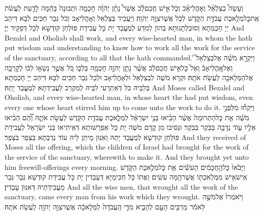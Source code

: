 \newperek
{}%
{וְעָשָׂה֩ בְצַלְאֵ֨ל וְאׇהֳלִיאָ֜ב וְכֹ֣ל \legarmeh  אִ֣ישׁ חֲכַם\maqqaf לֵ֗ב אֲשֶׁר֩ נָתַ֨ן יְהֹוָ֜ה חׇכְמָ֤ה וּתְבוּנָה֙ בָּהֵ֔מָּה לָדַ֣עַת לַעֲשֹׂ֔ת אֶֽת\maqqaf כׇּל\maqqaf מְלֶ֖אכֶת עֲבֹדַ֣ת הַקֹּ֑דֶשׁ לְכֹ֥ל אֲשֶׁר\maqqaf צִוָּ֖ה יְהֹוָֽה׃}
{וְיַעֲבֵיד בְּצַלְאֵל וְאָהֳלִיאָב וְכֹל גְּבַר חַכִּים לִבָּא דִּיהַב יְיָ חָכְמְתָא וְסוּכְלְתָנוּתָא בְּהוֹן לְמִדַּע לְמֶעֱבַד יָת כָּל עֲבִידַת פּוּלְחַן קוּדְשָׁא לְכָל דְּפַקֵּיד יְיָ׃}
{And Bezalel and Oholiab shall work, and every wise-hearted man, in whom the \lord\space hath put wisdom and understanding to know how to work all the work for the service of the sanctuary, according to all that the \lord\space hath commanded.’}{}
{וַיִּקְרָ֣א מֹשֶׁ֗ה אֶל\maqqaf בְּצַלְאֵל֮ וְאֶל\maqqaf אׇֽהֳלִיאָב֒ וְאֶל֙ כׇּל\maqqaf אִ֣ישׁ חֲכַם\maqqaf לֵ֔ב אֲשֶׁ֨ר נָתַ֧ן יְהֹוָ֛ה חׇכְמָ֖ה בְּלִבּ֑וֹ כֹּ֚ל אֲשֶׁ֣ר נְשָׂא֣וֹ לִבּ֔וֹ לְקׇרְבָ֥ה אֶל\maqqaf הַמְּלָאכָ֖ה לַעֲשֹׂ֥ת אֹתָֽהּ׃}
{וּקְרָא מֹשֶׁה לִבְצַלְאֵל וּלְאָהֳלִיאָב וּלְכָל גְּבַר חַכִּים לִבָּא דִּיהַב יְיָ חָכְמְתָא בְּלִבֵּיהּ כֹּל דְּאִתְרְעִי לִבֵּיהּ לְמִקְרַב לַעֲבִידְתָא לְמֶעֱבַד יָתַהּ׃}
{And Moses called Bezalel and Oholiab, and every wise-hearted man, in whose heart the \lord\space had put wisdom, even every one whose heart stirred him up to come unto the work to do it.}{}
{וַיִּקְח֞וּ מִלִּפְנֵ֣י מֹשֶׁ֗ה אֵ֤ת כׇּל\maqqaf הַתְּרוּמָה֙ אֲשֶׁ֨ר הֵבִ֜יאוּ בְּנֵ֣י יִשְׂרָאֵ֗ל לִמְלֶ֛אכֶת עֲבֹדַ֥ת הַקֹּ֖דֶשׁ לַעֲשֹׂ֣ת אֹתָ֑הּ וְ֠הֵ֠ם הֵבִ֨יאוּ אֵלָ֥יו ע֛וֹד נְדָבָ֖ה בַּבֹּ֥קֶר בַּבֹּֽקֶר׃}
{וּנְסִיבוּ מִן קֳדָם מֹשֶׁה יָת כָּל אַפְרָשׁוּתָא דְּאֵיתִיאוּ בְּנֵי יִשְׂרָאֵל לַעֲבִידַת פּוּלְחַן קוּדְשָׁא לְמֶעֱבַד יָתַהּ וְאִנּוּן מֵיתַן לֵיהּ עוֹד נְדַבְתָּא בִּצְפַר בִּצְפַר׃}
{And they received of Moses all the offering, which the children of Israel had brought for the work of the service of the sanctuary, wherewith to make it. And they brought yet unto him freewill-offerings every morning.}{}
{וַיָּבֹ֙אוּ֙ כׇּל\maqqaf הַ֣חֲכָמִ֔ים הָעֹשִׂ֕ים אֵ֖ת כׇּל\maqqaf מְלֶ֣אכֶת הַקֹּ֑דֶשׁ אִֽישׁ\maqqaf אִ֥ישׁ מִמְּלַאכְתּ֖וֹ אֲשֶׁר\maqqaf הֵ֥מָּה עֹשִֽׂים׃}
{וַאֲתוֹ כָּל חַכִּימַיָּא דְּעָבְדִין יָת כָּל עֲבִידַת קוּדְשָׁא גְּבַר גְּבַר מֵעֲבִידְתֵיהּ דְּאִנּוּן עָבְדִין׃}
{And all the wise men, that wrought all the work of the sanctuary, came every man from his work which they wrought.}{}
{וַיֹּאמְרוּ֙ אֶל\maqqaf מֹשֶׁ֣ה לֵּאמֹ֔ר מַרְבִּ֥ים הָעָ֖ם לְהָבִ֑יא מִדֵּ֤י הָֽעֲבֹדָה֙ לַמְּלָאכָ֔ה אֲשֶׁר\maqqaf צִוָּ֥ה יְהֹוָ֖ה לַעֲשֹׂ֥ת אֹתָֽהּ׃}
